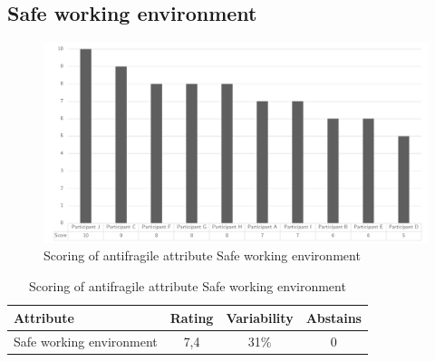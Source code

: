 \subsection{Safe working environment}
\begin{figure}[H]
	\centering
	\includegraphics[width=0.9\linewidth]{images/scoreafsafeworkingenvironnment}
	\caption[Scoring of antifragile attribute Safe working environment]{Scoring of antifragile attribute Safe working environment}
	\label{fig:appscoringafsafeworkingenvironnment}
\end{figure}
\begin{table}[H]
	\centering
	\begin{tabular}{p{}ccc}
		\toprule
		\textbf{Attribute} & \textbf{Rating} & \textbf{Variability} & \textbf{Abstains} \\
		\midrule
		Safe working environment & 7,4 & 31\% & 0 \\%
		\bottomrule
	\end{tabular}%
	\caption[Scoring of antifragile attribute Safe working environment]{Scoring of antifragile attribute Safe working environment}
	\label{tab:appscoringafsafeworkingenvironment}%
\end{table}%
\newpage
